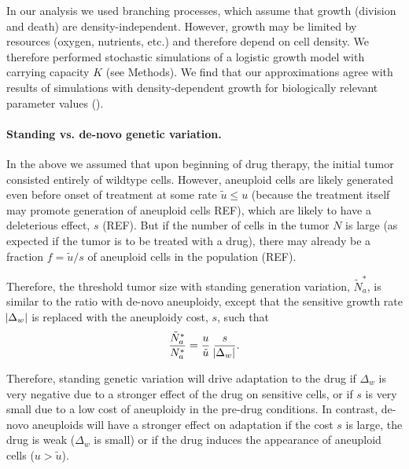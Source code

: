\documentclass[12pt]{extarticle}
\begin{document}
In our analysis we used branching processes, which assume that growth (division and death) are density-independent. However, growth may be limited by resources (oxygen, nutrients, etc.) and therefore depend on cell density. 
We therefore performed stochastic simulations of a logistic growth model with carrying capacity $K$ (see Methods). 
We find that our approximations agree with results of simulations with density-dependent growth for biologically relevant parameter values ().

\paragraph*{Standing vs. de-novo genetic variation.}

In the above we assumed that upon beginning of drug therapy, the initial tumor consisted entirely of wildtype cells.
However, aneuploid cells are likely generated even before onset of treatment at some rate $\tilde{u} \le u$ (because the treatment itself may promote generation of aneuploid cells REF), which are likely to have a deleterious effect, $s$ (REF). %
But if the number of cells in the tumor $N$ is large (as expected if the tumor is to be treated with a drug), there may already be a fraction $f=\tilde{u}/s$ of aneuploid cells in the population (REF).

Therefore, the threshold tumor size with standing generation variation, $\tilde{N}^*_{a}$, is similar to the ratio with de-novo aneuploidy, except that the sensitive growth rate $\abs{\Delta_w}$ is replaced with the aneuploidy cost, $s$, such that 
\begin{equation}
\frac{\tilde{N}^*_{a}}{N^*_{a}} = \frac{u}{\tilde{u}} \; \frac{s}{\abs{\Delta_w}} .
\end{equation}

Therefore, standing genetic variation will drive adaptation to the drug if $\Delta_w$ is very negative due to a stronger effect of the drug on sensitive cells, or if $s$ is very small due to a low cost of aneuploidy in the pre-drug conditions.
In contrast, de-novo aneuploids will have a stronger effect on adaptation if the cost $s$ is large, the drug is weak ($\Delta_w$ is small) or if the drug induces the appearance of aneuploid cells ($u > \tilde u$). 

\end{document}
